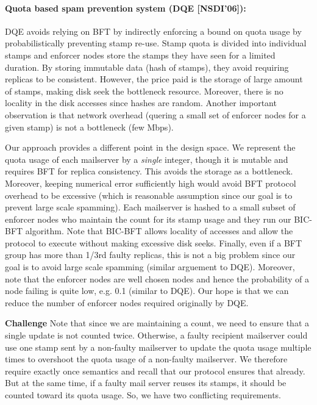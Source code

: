 \documentclass[twocolumn,10pt]{article}
\begin{document}
{\paragraph{Quota based spam prevention system (DQE [NSDI'06]):} DQE 
avoids relying on BFT by indirectly enforcing a bound on quota usage by
probabilistically preventing stamp re-use. Stamp quota is divided into
individual stamps and enforcer nodes store the stamps they have seen for 
a limited duration. By storing immutable data (hash of stamps), they avoid
requiring replicas to be consistent. However, the price paid is the storage
of large amount of stamps, making disk seek the bottleneck resource. Moreover,
there is no locality in the disk accesses since hashes are random. Another
important observation is that network overhead (quering a small set of 
enforcer nodes for a given stamp) is not a bottleneck (few Mbps). 

Our approach
provides a different point in the design space. We represent the quota usage
of each mailserver by a \textit{single} integer, though it is mutable and 
requires BFT for replica consistency. This avoids the storage as a bottleneck.
Moreover, keeping numerical error sufficiently high would avoid BFT protocol
overhead to be excessive (which is reasonable assumption since our goal is to
prevent large scale spamming). Each mailserver is hashed to a small subset of
enforcer nodes who maintain the count for its stamp usage and they run our
BIC-BFT algorithm. Note that BIC-BFT allows locality of accesses and allow
the protocol to execute without making excessive disk seeks. Finally, even if
a BFT group has more than 1/3rd faulty replicas, this is not a big problem since
our goal is to avoid large scale spamming (similar arguement to DQE). Moreover,
note that the enforcer nodes are well chosen nodes and hence the probability
of a node failing is quite low, e.g. 0.1 (similar to DQE). Our hope
is that we can reduce the number of enforcer nodes required originally by DQE.
 
\textbf{Challenge} Note that since we are maintaining a count, we need to 
ensure that a single
update is not counted twice. Otherwise, a faulty recipient mailserver could
use one stamp sent by a non-faulty mailserver to update the quota usage 
multiple times to overshoot the quota usage of a non-faulty mailserver. 
We therefore require exactly once semantics and recall that our protocol 
ensures that already. But at the same time, if a faulty
mail server reuses its stamps, it should be counted toward its quota usage.
So, we have two conflicting requirements.

}
\end{document}
